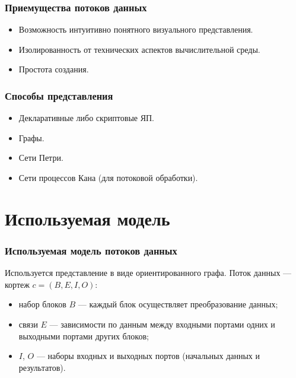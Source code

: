 \documentclass[10pt,pdf,hyperref={unicode}]{beamer}
\begin{document}
\begin{frame}
  \frametitle{Приемущества потоков данных}
  \begin{itemize}
    \item Возможность интуитивно понятного визуального представления.
    \item Изолированность от технических аспектов вычислительной среды.
    \item Простота создания.
  \end{itemize}
\end{frame}

\begin{frame}
  \frametitle{Способы представления}
  \begin{itemize}
    \item Декларативные либо скриптовые ЯП.
    \item Графы.
    \item Сети Петри.
    \item Сети процессов Кана (для потоковой обработки).
  \end{itemize}
\end{frame}

\section{Используемая модель}

\begin{frame}
  \frametitle{Используемая модель потоков данных}
  Используется представление в виде ориентированного графа.
  Поток данных --- кортеж $c = (B, E, I, O)$:
  \begin{itemize}
    \item набор блоков $B$ --- каждый блок осуществляет преобразование данных;
    \item связи $E$ --- зависимости по данным между входными портами одних и выходными портами других блоков;
    \item $I$, $O$ --- наборы входных и выходных портов (начальных данных и результатов).
  \end{itemize}
\end{frame}
\end{document}
